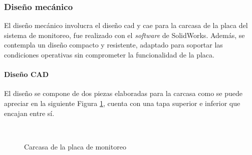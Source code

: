 \subsubsection{Diseño mecánico}
El diseño mecánico involucra el diseño \acrshort{cad} y \acrshort{cae} para la carcasa de la placa del sistema de monitoreo, fue realizado con el \textit{software} de SolidWorks. Además, se contempla un diseño compacto y resistente, adaptado para soportar las condiciones operativas sin comprometer la funcionalidad de la placa.
\paragraph{Diseño CAD}
El diseño se compone de dos piezas elaboradas para la carcasa como se puede apreciar en la siguiente Figura \ref{fig:case}, cuenta con una tapa superior e inferior que encajan entre sí.
\begin{figure}[hpt]
    \centering
    \caption{Carcasa de la placa de monitoreo}
            \qquad      %
        \\
    \label{fig:case}
\end{figure}

